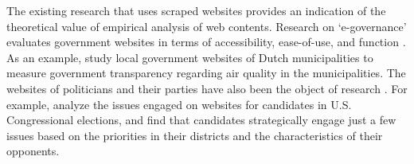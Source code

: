\documentclass[11pt]{article}
\begin{document}

The existing research that uses scraped websites provides an indication of the theoretical value of empirical analysis of web contents. Research on `e-governance' evaluates government websites in terms of accessibility, ease-of-use, and function \citep[e.g., ][]{Urban2002,mcnutt2010virtual,Armstrong2011,Feeney2017}. As an example, \cite{grimmelikhuijsen2012developing} study local government websites of Dutch municipalities to measure government transparency regarding air quality in the municipalities. The websites of politicians and their parties have also been the object of research \citep{Druckman2009,Druckman2010,Cryer2017,Esterling2011,Esterling2011a,Norris2003,Therriault2010}. For example, \cite{Druckman2010} analyze the issues engaged on websites for candidates in U.S. Congressional elections, and find that candidates strategically engage just a few issues based on the priorities in their districts and the characteristics of their opponents.  

\end{document}
